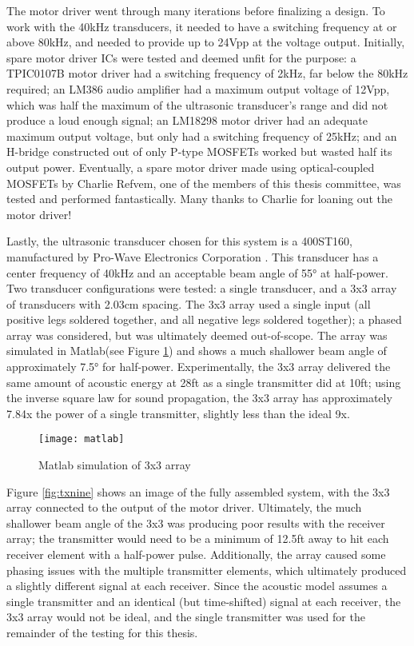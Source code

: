 \documentclass[11pt]{ucthesisCP}
\begin{document}
The motor driver went through many iterations before finalizing a design. To work with the 40kHz transducers, it needed to have a switching frequency at or above 80kHz, and needed to provide up to 24Vpp at the voltage output. Initially, spare motor driver ICs were tested and deemed unfit for the purpose: a TPIC0107B motor driver had a switching frequency of 2kHz, far below the 80kHz required; an LM386 audio amplifier had a maximum output voltage of 12Vpp, which was half the maximum of the ultrasonic transducer’s range and did not produce a loud enough signal; an LM18298 motor driver had an adequate maximum output voltage, but only had a switching frequency of 25kHz; and an H-bridge constructed out of only P-type MOSFETs worked but wasted half its output power. Eventually, a spare motor driver made using optical-coupled MOSFETs by Charlie Refvem, one of the members of this thesis committee, was tested and performed fantastically. Many thanks to Charlie for loaning out the motor driver!

Lastly, the ultrasonic transducer chosen for this system is a 400ST160, manufactured by Pro-Wave Electronics Corporation \cite{400sr160}. This transducer has a center frequency of 40kHz and an acceptable beam angle of 55° at half-power. Two transducer configurations were tested: a single transducer, and a 3x3 array of transducers with 2.03cm spacing. The 3x3 array used a single input (all positive legs soldered together, and all negative legs soldered together); a phased array was considered, but was ultimately deemed out-of-scope. The array was simulated in Matlab\textsuperscript{\textregistered}\xspace (see Figure \ref{fig:matlab}) and shows a much shallower beam angle of approximately 7.5° for half-power. Experimentally, the 3x3 array delivered the same amount of acoustic energy at 28ft as a single transmitter did at 10ft; using the inverse square law for sound propagation, the 3x3 array has approximately 7.84x the power of a single transmitter, slightly less than the ideal 9x.

\begin{figure}[htbp]
	\centering
	\texttt{[image: matlab]}
	\caption{Matlab simulation of 3x3 array}
	\label{fig:matlab}
\end{figure}

Figure \ref{fig:txnine} shows an image of the fully assembled system, with the 3x3 array connected to the output of the motor driver. Ultimately, the much shallower beam angle of the 3x3 was producing poor results with the receiver array; the transmitter would need to be a minimum of 12.5ft away to hit each receiver element with a half-power pulse. Additionally, the array caused some phasing issues with the multiple transmitter elements, which ultimately produced a slightly different signal at each receiver. Since the acoustic model assumes a single transmitter and an identical (but time-shifted) signal at each receiver, the 3x3 array would not be ideal, and the single transmitter was used for the remainder of the testing for this thesis.
\end{document}
